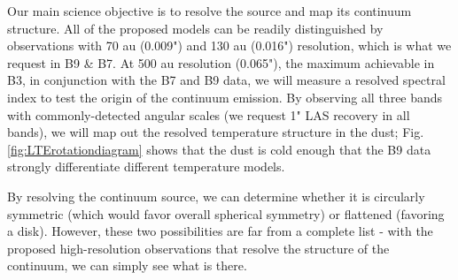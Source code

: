 \documentclass[12pt,a4paper]{article}  %
\begin{document}
Our main science objective is to resolve the source and map its continuum structure.
All of the proposed models can be readily distinguished by observations with 70 au (0.009") and 130 au (0.016") resolution, which is what we request in B9 \& B7.
At 500 au resolution (0.065"), the maximum achievable in B3, in conjunction with the B7 and B9 data, we will measure a resolved spectral index to test the origin of the continuum emission.
By observing all three bands with commonly-detected angular scales (we request 1" LAS recovery in all bands), we will map out the resolved temperature structure in the dust; Fig. \ref{fig:LTErotationdiagram} shows that the dust is cold enough that the B9 data strongly differentiate different temperature models.

By resolving the continuum source, we can determine whether it is circularly symmetric (which would favor overall spherical symmetry) or flattened (favoring a disk).
However, these two possibilities are far from a complete list - with the proposed high-resolution observations that resolve the structure of the continuum, we can simply see what is there.







\end{document}
